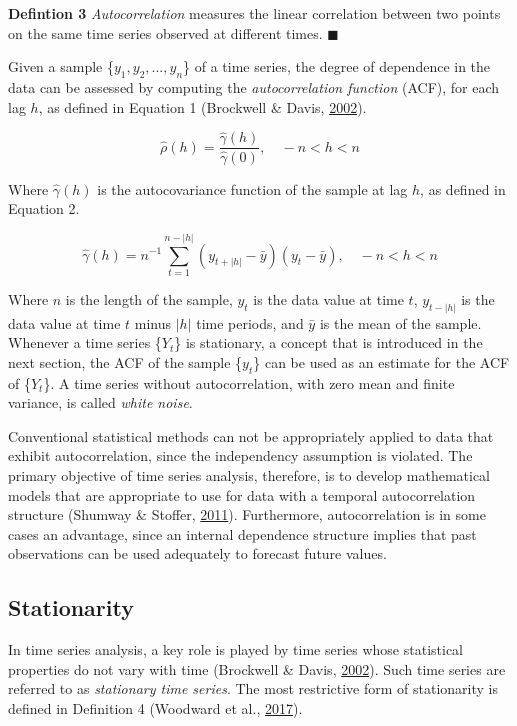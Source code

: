 \documentclass[12pt,oneside]{reedthesis}
\begin{document}
\textbf{Defintion 3} \emph{Autocorrelation} measures the linear
correlation between two points on the same time series observed at
different times. \(\blacksquare\)

Given a sample \{\(y_{1}, y_{2}, ... , y_{n}\)\} of a time series, the
degree of dependence in the data can be assessed by computing the
\emph{autocorrelation function} (ACF), for each lag \(h\), as defined in
Equation 1 (Brockwell \& Davis,
\protect\hyperlink{ref-brockwell2002}{2002}).

\[ \hat\rho(h) = \frac{\hat\gamma(h)}{\hat\gamma(0)}, \quad -n < h < n \]

Where \(\hat\gamma(h)\) is the autocovariance function of the sample at
lag \(h\), as defined in Equation 2.

\[ \hat\gamma(h) = n^{-1}\sum_{t=1}^{n-|h|}(y_{t+|h|} - \bar{y})(y_{t} - \bar{y}), \quad -n < h < n \]

Where \(n\) is the length of the sample, \(y_{t}\) is the data value at
time \(t\), \(y_{t-|h|}\) is the data value at time \(t\) minus \(|h|\)
time periods, and \(\bar{y}\) is the mean of the sample. Whenever a time
series \{\(Y_{t}\)\} is stationary, a concept that is introduced in the
next section, the ACF of the sample \{\(y_{t}\)\} can be used as an
estimate for the ACF of \{\(Y_{t}\)\}. A time series without
autocorrelation, with zero mean and finite variance, is called
\emph{white noise}.

Conventional statistical methods can not be appropriately applied to
data that exhibit autocorrelation, since the independency assumption is
violated. The primary objective of time series analysis, therefore, is
to develop mathematical models that are appropriate to use for data with
a temporal autocorrelation structure (Shumway \& Stoffer,
\protect\hyperlink{ref-shumway2011}{2011}). Furthermore, autocorrelation
is in some cases an advantage, since an internal dependence structure
implies that past observations can be used adequately to forecast future
values.

\subsection{Stationarity}\label{stationarity}

In time series analysis, a key role is played by time series whose
statistical properties do not vary with time (Brockwell \& Davis,
\protect\hyperlink{ref-brockwell2002}{2002}). Such time series are
referred to as \emph{stationary time series}. The most restrictive form
of stationarity is defined in Definition 4 (Woodward et al.,
\protect\hyperlink{ref-woodward2017}{2017}).
\end{document}
